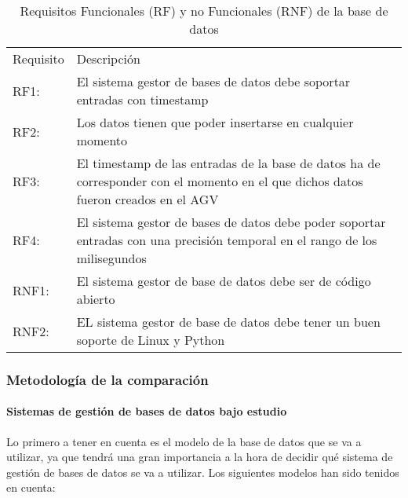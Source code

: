 \begin{table}[H]
    \begin{tabularx}{\textwidth}{l X}
        \toprule
        Requisito                 & Descripción \\
        \otoprule
        RF1:                & El sistema gestor de bases de datos debe soportar entradas con timestamp \\
        \rowcolor{gray!35}
        RF2:                & Los datos tienen que poder insertarse en cualquier momento \\
        RF3:                & El timestamp de las entradas de la base de datos ha de corresponder con el momento en el que dichos datos fueron creados en el AGV \\
        \rowcolor{gray!35}
        RF4:                & El sistema gestor de bases de datos debe poder soportar entradas con una precisión temporal en el rango de los milisegundos \\
        RNF1:                & El sistema gestor de base de datos debe ser de código abierto \\
        \rowcolor{gray!35}
        RNF2:                & EL sistema gestor de base de datos debe tener un buen soporte de Linux y Python \\
        \bottomrule
    \end{tabularx}
    \caption{Requisitos Funcionales (RF) y no Funcionales (RNF) de la base de datos}
    \label{tabla:req}
\end{table}

\subsubsection{Metodología de la comparación}

\paragraph{Sistemas de gestión de bases de datos bajo estudio}

Lo primero a tener en cuenta es el modelo de la base de datos que se va a utilizar, ya que tendrá una gran importancia
a la hora de decidir qué sistema de gestión de bases de datos se va a utilizar. Los siguientes modelos \cite{10.5555/3364297} han sido
tenidos en cuenta: 

